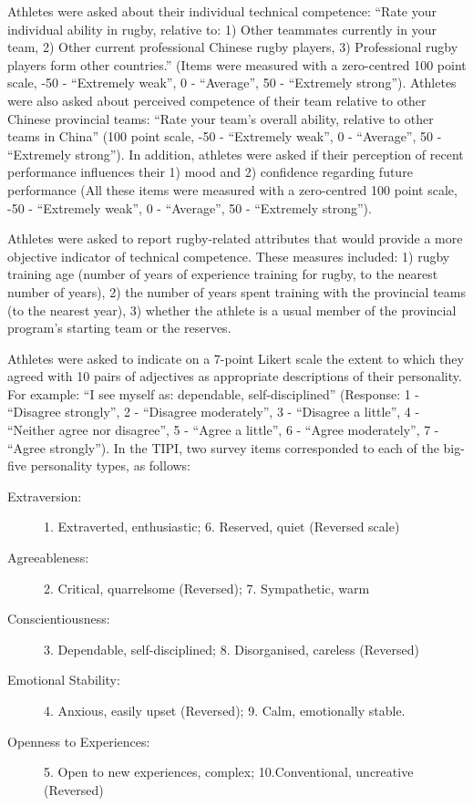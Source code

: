 Athletes were asked about their individual technical competence: ``Rate your individual ability in rugby, relative to: 1) Other teammates currently in your team, 2) Other current professional Chinese rugby players, 3) Professional rugby players form other countries.'' (Items were measured with a zero-centred 100 point scale, -50 - ``Extremely weak'', 0 - ``Average'', 50 - ``Extremely strong'').  Athletes were also asked about perceived competence of their team relative to other Chinese provincial teams: ``Rate your team's overall ability, relative to other teams in China'' (100 point scale, -50 - ``Extremely weak'', 0 - ``Average'', 50 - ``Extremely strong'').  In addition, athletes were asked if their perception of recent performance influences their 1) mood and 2) confidence regarding future performance (All these items were measured with a zero-centred 100 point scale, -50 - ``Extremely weak'', 0 - ``Average'', 50 - ``Extremely strong'').

Athletes were asked to report rugby-related attributes that would provide a more objective indicator of technical competence. These measures included: 1) rugby training age (number of years of experience training for rugby, to the nearest number of years), 2) the number of years spent training with the provincial teams (to the nearest year), 3) whether the athlete is a usual member of the provincial program's starting team or the reserves.


Athletes were asked to indicate on a 7-point Likert scale the extent to which they agreed with 10 pairs of adjectives as appropriate descriptions of their personality. For example: ``I see myself as: dependable, self-disciplined'' (Response: 1 - ``Disagree strongly'', 2 - ``Disagree moderately'',  3 - ``Disagree a little'', 4 - ``Neither agree nor disagree'', 5 - ``Agree a little'', 6 - ``Agree moderately'', 7 - ``Agree strongly''). In the TIPI, two survey items corresponded to each of the big-five personality types, as follows:

\begin{description}
\item [Extraversion:] 1. Extraverted, enthusiastic; 6. Reserved, quiet (Reversed scale)
\item [Agreeableness:] 2. Critical, quarrelsome (Reversed); 7. Sympathetic, warm
\item [Conscientiousness:] 3. Dependable, self-disciplined; 8. Disorganised, careless (Reversed)
\item [Emotional Stability:] 4. Anxious, easily upset (Reversed); 9. Calm, emotionally stable.
\item [Openness to Experiences:] 5. Open to new experiences, complex; 10.Conventional, uncreative (Reversed)
\end{description}


